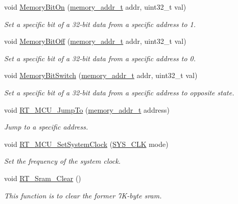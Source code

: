 \begin{DoxyCompactItemize}
void \mbox{\hyperlink{a00020_a23e80593caa37b5d932a8320dc561830}{Memory\+Bit\+On}} (\mbox{\hyperlink{a00020_a06da901348542a481c297d9b700e2001}{memory\+\_\+addr\+\_\+t}} addr, uint32\+\_\+t val)
\begin{DoxyCompactList}\small\item\em Set a specific bit of a 32-\/bit data from a specific address to 1. \end{DoxyCompactList}\item 
void \mbox{\hyperlink{a00020_a29fb2c978051c0cff760432e2378f3a3}{Memory\+Bit\+Off}} (\mbox{\hyperlink{a00020_a06da901348542a481c297d9b700e2001}{memory\+\_\+addr\+\_\+t}} addr, uint32\+\_\+t val)
\begin{DoxyCompactList}\small\item\em Set a specific bit of a 32-\/bit data from a specific address to 0. \end{DoxyCompactList}\item 
void \mbox{\hyperlink{a00020_a7a3766694541dd5c639d4a11897aaeb9}{Memory\+Bit\+Switch}} (\mbox{\hyperlink{a00020_a06da901348542a481c297d9b700e2001}{memory\+\_\+addr\+\_\+t}} addr, uint32\+\_\+t val)
\begin{DoxyCompactList}\small\item\em Set a specific bit of a 32-\/bit data from a specific address to opposite state. \end{DoxyCompactList}\item 
void \mbox{\hyperlink{a00020_a81b750927e5dc24f1595c15e7dd7bdf5}{R\+T\+\_\+\+M\+C\+U\+\_\+\+Jump\+To}} (\mbox{\hyperlink{a00020_a06da901348542a481c297d9b700e2001}{memory\+\_\+addr\+\_\+t}} address)
\begin{DoxyCompactList}\small\item\em Jump to a specific address. \end{DoxyCompactList}\item 
void \mbox{\hyperlink{a00020_a8e87aa8d85986723da69a68cd0d1e51c}{R\+T\+\_\+\+M\+C\+U\+\_\+\+Set\+System\+Clock}} (\mbox{\hyperlink{a00020_ae3a2d501b8662e11b969fb4a5e195e5b}{S\+Y\+S\+\_\+\+C\+LK}} mode)
\begin{DoxyCompactList}\small\item\em Set the frequency of the system clock. \end{DoxyCompactList}\item 
void \mbox{\hyperlink{a00020_ad514417aa2e5a5d061a5eabeceae20c6}{R\+T\+\_\+\+Sram\+\_\+\+Clear}} ()
\begin{DoxyCompactList}\small\item\em This function is to clear the former 7\+K-\/byte sram. \end{DoxyCompactList}\end{DoxyCompactItemize}


